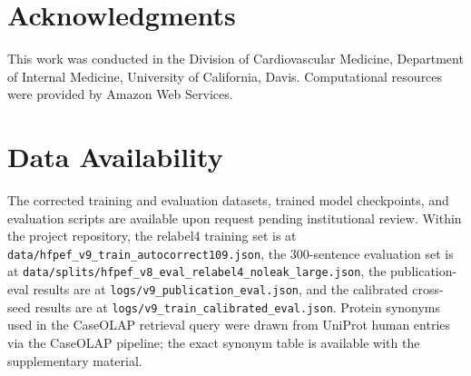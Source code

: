 \documentclass[sn-basic,pdflatex]{sn-jnl}
\begin{document}
\section*{Acknowledgments}

This work was conducted in the Division of Cardiovascular Medicine, Department of Internal Medicine, University of California, Davis. Computational resources were provided by Amazon Web Services.

\section*{Data Availability}

The corrected training and evaluation datasets, trained model checkpoints, and evaluation scripts are available upon request pending institutional review. Within the project repository, the relabel4 training set is at \texttt{data/hfpef\_v9\_train\_autocorrect109.json}, the 300-sentence evaluation set is at \texttt{data/splits/hfpef\_v8\_eval\_relabel4\_noleak\_large.json}, the publication-eval results are at \texttt{logs/v9\_publication\_eval.json}, and the calibrated cross-seed results are at \texttt{logs/v9\_train\_calibrated\_eval.json}. Protein synonyms used in the CaseOLAP retrieval query were drawn from UniProt human entries via the CaseOLAP pipeline; the exact synonym table is available with the supplementary material.

\begingroup
\setlength{\bibsep}{4pt plus 2pt minus 1pt}
\renewcommand{\bibfont}{\normalsize}

\endgroup
\end{document}
